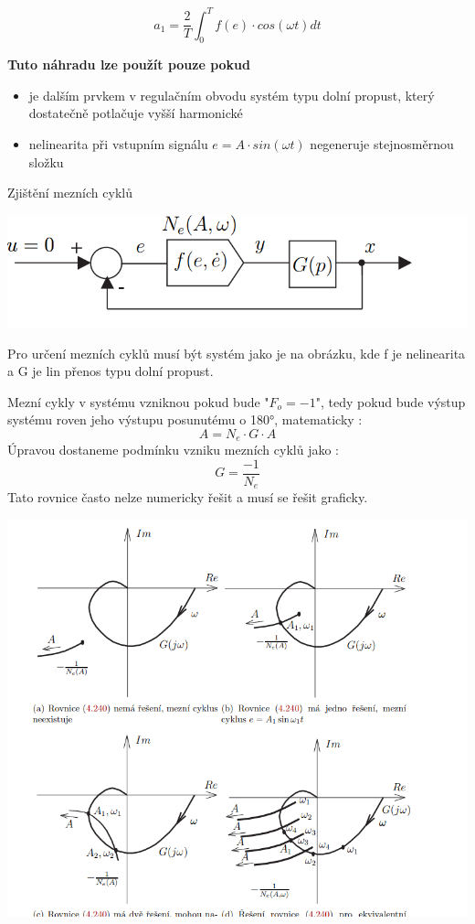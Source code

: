\begin{equation*}
    a_1=\frac{2}{T} \int_{0}^{T} f(e) \cdot cos(\omega t) dt
\end{equation*}

{\bf Tuto náhradu lze použít pouze pokud}
\begin{itemize}
    \item je dalším prvkem v regulačním obvodu systém typu dolní propust, který dostatečně potlačuje vyšší harmonické
    \item nelinearita při vstupním signálu $e=A\cdot sin (\omega t) $ negeneruje stejnosměrnou složku
\end{itemize}

Zjištění mezních cyklů 

\includegraphics{img/harm.rovnovha.png}

Pro určení mezních cyklů musí být systém jako je na obrázku, kde f je nelinearita a G je lin přenos typu dolní propust.

Mezní cykly v systému vzniknou pokud bude "$ F_o =-1 $", tedy pokud bude výstup systému 
roven jeho výstupu posunutému o 180°, matematicky :
\begin{equation*}
    A= N_e \cdot G \cdot A
\end{equation*}
Úpravou dostaneme podmínku vzniku mezních cyklů jako :
\begin{equation*}
    G=\frac{-1}{N_e}
\end{equation*}
Tato rovnice často nelze numericky řešit a musí se řešit graficky.

\includegraphics{img/garf.reseni.png}

